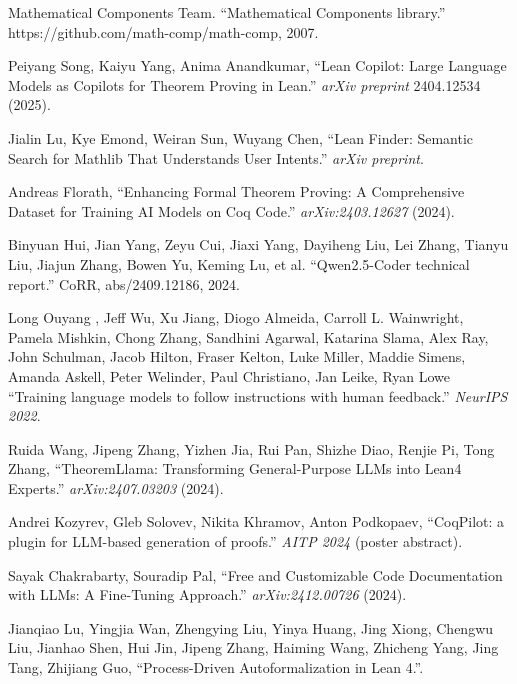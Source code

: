 \documentclass[11pt,a4paper]{article}
\begin{document}
\newpage

\begin{thebibliography}{9}

    Mathematical Components Team.
    ``Mathematical Components library.''
    https://github.com/math-comp/math-comp, 2007.
    
    Peiyang Song, Kaiyu Yang, Anima Anandkumar,
    ``Lean Copilot: Large Language Models as Copilots for Theorem Proving in Lean.''
    \emph{arXiv preprint} 2404.12534 (2025).

    Jialin Lu, Kye Emond, Weiran Sun, Wuyang Chen,
    ``Lean Finder: Semantic Search for Mathlib That Understands User Intents.''
    \emph{arXiv preprint}.

    Andreas Florath,
    ``Enhancing Formal Theorem Proving: A Comprehensive Dataset for Training AI Models on Coq Code.''
    \emph{arXiv:2403.12627} (2024).

    Binyuan Hui, Jian Yang, Zeyu Cui, Jiaxi Yang, Dayiheng Liu, Lei Zhang, Tianyu Liu, Jiajun Zhang, Bowen
Yu, Keming Lu, et al.
    ``Qwen2.5-Coder technical report.'' CoRR, abs/2409.12186, 2024.

    Long Ouyang , Jeff Wu, Xu Jiang, Diogo Almeida, Carroll L. Wainwright, Pamela Mishkin, Chong Zhang, Sandhini Agarwal, Katarina Slama, Alex Ray, John Schulman, Jacob Hilton, Fraser Kelton, Luke Miller, Maddie Simens, Amanda Askell, Peter Welinder, Paul Christiano, Jan Leike, Ryan Lowe
    ``Training language models to follow instructions with human feedback.''
    \emph{NeurIPS 2022}.

    Ruida Wang, Jipeng Zhang, Yizhen Jia, Rui Pan, Shizhe Diao, Renjie Pi, Tong Zhang,
    ``TheoremLlama: Transforming General-Purpose LLMs into Lean4 Experts.''
    \emph{arXiv:2407.03203} (2024).

    Andrei Kozyrev, Gleb Solovev, Nikita Khramov, Anton Podkopaev,
    ``CoqPilot: a plugin for LLM-based generation of proofs.''
    \emph{AITP 2024} (poster abstract).

    Sayak Chakrabarty, Souradip Pal,
    ``Free and Customizable Code Documentation with LLMs: A Fine-Tuning Approach.''
    \emph{arXiv:2412.00726} (2024).

    Jianqiao Lu, Yingjia Wan, Zhengying Liu, Yinya Huang, Jing Xiong, Chengwu Liu, Jianhao Shen, Hui Jin, Jipeng Zhang, Haiming Wang, Zhicheng Yang, Jing Tang, Zhijiang Guo,
    ``Process-Driven Autoformalization in Lean 4.''.


\end{thebibliography}
\end{document}

